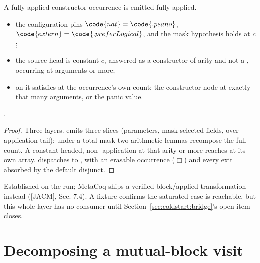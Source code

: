 \begin{theorem}
\label{thm:visitExpr_ctorSat}
\leanok
{}
 A fully-applied constructor occurrence is emitted fully applied.
\begin{itemize}
\item {} the configuration pins $\code{nat} = \code{.peano}$, $\code{extern} =
\code{.preferLogical}$, and the mask hypothesis holds at $c$;
\item the source head is constant $c$, answered as a constructor of arity  and not a
, occurring at  arguments or more;
\item {}  on it satisfies  at the occurrence's own count:
the constructor node at exactly that many arguments, or the panic value.
\end{itemize}
 \stProved{}.
\end{theorem}
\begin{proof}
\leanok
{}
 Three layers.  emits three slices (parameters, mask-selected fields,
over-application tail); under a total mask two arithmetic lemmas recompose the full count. A
constant-headed, non- application at that arity or more reaches  at
its own array.  dispatches to , with an erasable occurrence ($\Box$) and
every  exit absorbed by the default disjunct.
\end{proof}
\begin{remark}
 Established on the run; MetaCoq ships a verified block/applied transformation instead
([JACM], Sec. 7.4).
 A fixture confirms the saturated case is reachable, but this whole layer has no consumer
until Section~\ref{sec:coldstart:bridge}'s open item closes.
\end{remark}

\section{Decomposing a mutual-block visit}
\label{sec:coldstart:decomp}

